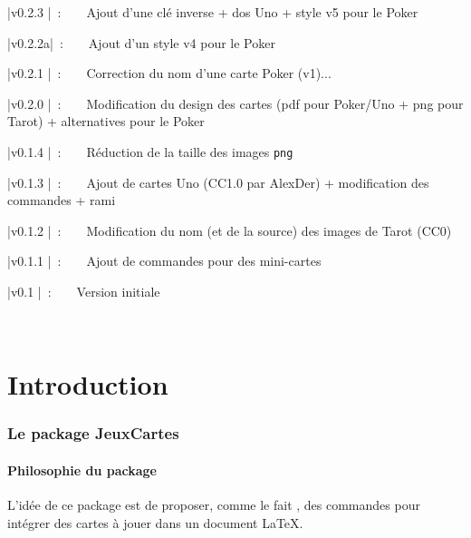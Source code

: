 \documentclass{article}
\newcommand\ctex[1]{\tcbox[vignettelatex]{#1}}
\begin{document}
{\small \bverb|v0.2.3 |~:~~~~Ajout d'une clé \textsf{inverse} + dos Uno + style v5 pour le Poker

{\small \bverb|v0.2.2a|~:~~~~Ajout d'un style v4 pour le Poker

{\small \bverb|v0.2.1 |~:~~~~Correction du nom d'une carte Poker (v1)...

{\small \bverb|v0.2.0 |~:~~~~Modification du design des cartes (pdf pour Poker/Uno + png pour Tarot) + alternatives pour le Poker

{\small \bverb|v0.1.4 |~:~~~~Réduction de la taille des images \texttt{png}

{\small \bverb|v0.1.3 |~:~~~~Ajout de cartes Uno (CC1.0 par AlexDer) + modification des commandes + rami

{\small \bverb|v0.1.2 |~:~~~~Modification du nom (et de la source) des images de Tarot (CC0)

{\small \bverb|v0.1.1 |~:~~~~Ajout de commandes pour des mini-cartes

{\small \bverb|v0.1   |~:~~~~Version initiale

\vfill~

\newpage

\part*{Introduction}

\section{Le package JeuxCartes}

\subsection{\og Philosophie \fg{} du package}

\begin{codeidee}
L'idée de ce package est de proposer, comme le fait \ctex{pst-poker}, des commandes pour intégrer des cartes à jouer dans un document \LaTeX.


\end{codeidee}}}}}}}}}}
\end{document}
